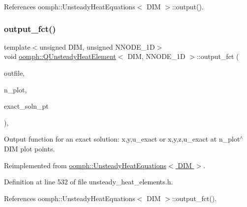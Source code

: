 References oomph\+::\+Unsteady\+Heat\+Equations$<$ D\+I\+M $>$\+::output().

\mbox{\label{classoomph_1_1QUnsteadyHeatElement_a4a9b9735828f0e11fd439944e2332781}} 
\subsubsection{\texorpdfstring{output\+\_\+fct()}{output\_fct()}\hspace{0.1cm}{\footnotesize\ttfamily [1/2]}}
{\footnotesize\ttfamily template$<$unsigned D\+IM, unsigned N\+N\+O\+D\+E\+\_\+1D$>$ \\
void \hyperlink{classoomph_1_1QUnsteadyHeatElement}{oomph\+::\+Q\+Unsteady\+Heat\+Element}$<$ D\+IM, N\+N\+O\+D\+E\+\_\+1D $>$\+::output\+\_\+fct (\begin{DoxyParamCaption}\item[{std\+::ostream \&}]{outfile,  }\item[{const unsigned \&}]{n\+\_\+plot,  }\item[{\hyperlink{classoomph_1_1FiniteElement_a690fd33af26cc3e84f39bba6d5a85202}{Finite\+Element\+::\+Steady\+Exact\+Solution\+Fct\+Pt}}]{exact\+\_\+soln\+\_\+pt }\end{DoxyParamCaption})\hspace{0.3cm}{\ttfamily [inline]}, {\ttfamily [virtual]}}



Output function for an exact solution\+: x,y,u\+\_\+exact or x,y,z,u\+\_\+exact at n\+\_\+plot$^\wedge$\+D\+IM plot points. 



Reimplemented from \hyperlink{classoomph_1_1UnsteadyHeatEquations_acdd4e941a196d267ad9534aef16db1a9}{oomph\+::\+Unsteady\+Heat\+Equations$<$ D\+I\+M $>$}.



Definition at line 532 of file unsteady\+\_\+heat\+\_\+elements.\+h.



References oomph\+::\+Unsteady\+Heat\+Equations$<$ D\+I\+M $>$\+::output\+\_\+fct().

\mbox{\label{classoomph_1_1QUnsteadyHeatElement_acf12936a99c1b43eb9459035e0c2648d}} 
